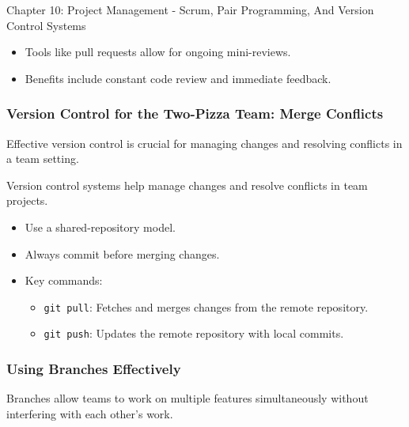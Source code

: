 \begin{notes}{Chapter 10: Project Management - Scrum, Pair Programming, And Version Control Systems}
\begin{highlight}
        \begin{itemize}
            \item Tools like pull requests allow for ongoing mini-reviews.
            \item Benefits include constant code review and immediate feedback.
        \end{itemize}
    
    \end{highlight}
    
    \subsubsection*{Version Control for the Two-Pizza Team: Merge Conflicts}
    
    Effective version control is crucial for managing changes and resolving conflicts in a team setting.
    
    \begin{highlight}
    
        Version control systems help manage changes and resolve conflicts in team projects.
        
        \begin{itemize}
            \item Use a shared-repository model.
            \item Always commit before merging changes.
            \item Key commands:
            \begin{itemize}
                \item \texttt{git pull}: Fetches and merges changes from the remote repository.
                \item \texttt{git push}: Updates the remote repository with local commits.
            \end{itemize}
        \end{itemize}
    
    \end{highlight}
    
    \subsubsection*{Using Branches Effectively}
    
    Branches allow teams to work on multiple features simultaneously without interfering with each other's work.
    
    \begin{highlight}
    

\end{highlight}
\end{notes}
